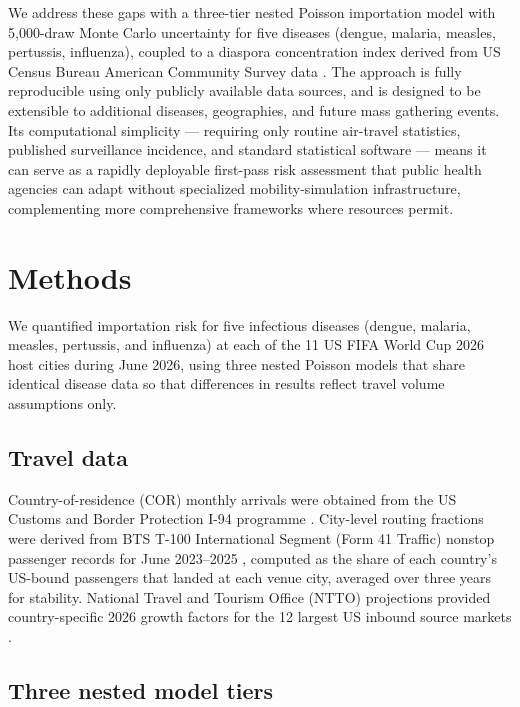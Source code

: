 \documentclass[12pt, a4paper]{article}
\begin{document}
We address these gaps with a three-tier nested Poisson importation model with 5,000-draw Monte Carlo uncertainty for five diseases (dengue, malaria, measles, pertussis, influenza), coupled to a diaspora concentration index derived from US Census Bureau American Community Survey data \citep{Census2026WC, tidycensus}. The approach is fully reproducible using only publicly available data sources, and is designed to be extensible to additional diseases, geographies, and future mass gathering events. Its computational simplicity --- requiring only routine air-travel statistics, published surveillance incidence, and standard statistical software --- means it can serve as a rapidly deployable first-pass risk assessment that public health agencies can adapt without specialized mobility-simulation infrastructure, complementing more comprehensive frameworks where resources permit.

\section{Methods}

We quantified importation risk for five infectious diseases (dengue, malaria, measles, pertussis, and influenza) at each of the 11 US FIFA World Cup 2026 host cities during June 2026, using three nested Poisson models that share identical disease data so that differences in results reflect travel volume assumptions only.

\subsection{Travel data}

Country-of-residence (COR) monthly arrivals were obtained from the US Customs and Border Protection I-94 programme \citep{CBP_I94}. City-level routing fractions were derived from BTS T-100 International Segment (Form 41 Traffic) nonstop passenger records for June 2023--2025 \citep{BTS_T100}, computed as the share of each country's US-bound passengers that landed at each venue city, averaged over three years for stability. National Travel and Tourism Office (NTTO) projections provided country-specific 2026 growth factors for the 12 largest US inbound source markets \citep{NTTO2025}.

\subsection{Three nested model tiers}
\end{document}
